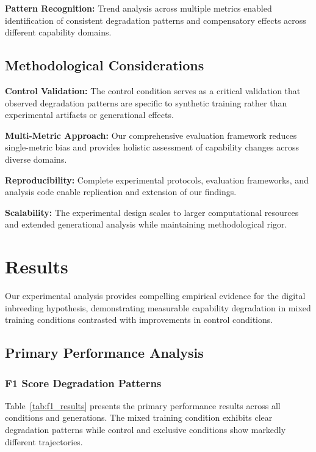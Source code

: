 \documentclass[11pt]{article}
\begin{document}
\textbf{Pattern Recognition:} Trend analysis across multiple metrics enabled identification of consistent degradation patterns and compensatory effects across different capability domains.

\subsection{Methodological Considerations}

\textbf{Control Validation:} The control condition serves as a critical validation that observed degradation patterns are specific to synthetic training rather than experimental artifacts or generational effects.

\textbf{Multi-Metric Approach:} Our comprehensive evaluation framework reduces single-metric bias and provides holistic assessment of capability changes across diverse domains.

\textbf{Reproducibility:} Complete experimental protocols, evaluation frameworks, and analysis code enable replication and extension of our findings.

\textbf{Scalability:} The experimental design scales to larger computational resources and extended generational analysis while maintaining methodological rigor.

\section{Results}

Our experimental analysis provides compelling empirical evidence for the digital inbreeding hypothesis, demonstrating measurable capability degradation in mixed training conditions contrasted with improvements in control conditions.

\subsection{Primary Performance Analysis}

\subsubsection{F1 Score Degradation Patterns}

Table~\ref{tab:f1_results} presents the primary performance results across all conditions and generations. The mixed training condition exhibits clear degradation patterns while control and exclusive conditions show markedly different trajectories.
\end{document}
